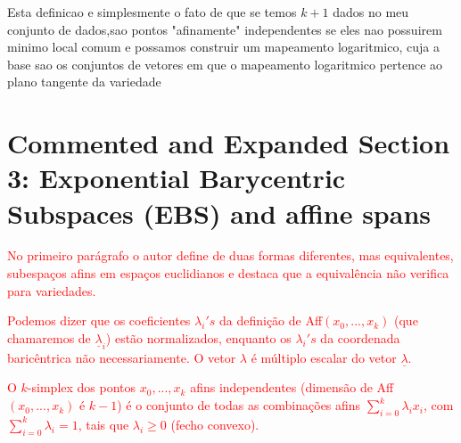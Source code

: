 \documentclass[a4paper,titlepage]{article}
\newcommand{\juliana}[1]{\textcolor{red}{#1}}
\begin{document}
Esta definicao e simplesmente o fato de que se temos $k+1$ dados no meu conjunto de dados,sao pontos "afinamente" independentes se eles nao possuirem minimo local comum e possamos construir um mapeamento logaritmico, cuja a base sao os conjuntos de vetores em que o mapeamento logaritmico pertence ao plano tangente da variedade
\section{Commented and Expanded Section 3: Exponential Barycentric Subspaces
(EBS) and affine spans}
{
\vspace{1em}
\vspace{1em}
}

\juliana{No primeiro parágrafo o autor define de duas formas diferentes, mas equivalentes, subespaços afins em espaços euclidianos e destaca que a equivalência não verifica para variedades.}

\juliana{Podemos dizer que os coeficientes $\lambda_i's$ da definição de Aff$(x_0 ,..., x_k)$ (que chamaremos de $\underline{\lambda}_i$) estão normalizados, enquanto os $\lambda_i's$ da coordenada baricêntrica não necessariamente. O vetor $\lambda$ é múltiplo escalar do vetor $\underline{\lambda}$.} 

\juliana{O $k$-simplex dos pontos $x_0, ..., x_k$ afins independentes (dimensão de Aff$(x_0 ,..., x_k)$ é $k-1$) é o conjunto de todas as combinações afins $\sum_{i=0}^k \lambda_i x_i$, com $\sum_{i=0}^k \lambda_i=1$, tais que $\lambda_i \geq 0$ (fecho convexo).}

{
\vspace{1em}
\vspace{1em}
}
\end{document}
